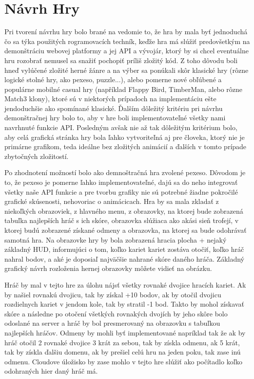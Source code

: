 \section{Návrh Hry}
Pri tvorení návrhu hry bolo brané na vedomie to, že hra by mala byť jednoduchá čo sa týka použitých rogramovacích techník, keďže hra má slúžiť predovšetkým na demonštráciu webovej platformy a jej API a vývojár, ktorý by si chcel eventuálne hru rozobrať nemusel sa snažiť pochopiť príliš zložitý kód. Z toho dôvodu boli hneď vylúčené zložité herné žánre a na výber sa ponúkali skôr klasické hry (rôzne logické stolné hry, ako pexeso, puzzle...), alebo pomerne nové obľúbené a populárne mobilné casual hry (například Flappy Bird, TimberMan, alebo rôzne Match3 klony), ktoré sú v niektorých prípadoch na implementáciu ešte jendoduchšie ako spomínané klasické. Ďalším dôležitý kritériu pri návrhu demonštračnej hry bolo to, aby v hre boli implementovateľné všetky nami navrhnuté funkcie API. Posledným avšak nie až tak dôležitým kritérium bolo, aby celá grafická stránka hry bola ľahko vytvoriteľná aj pre človeka, ktorý nie je primárne grafikom, teda ideálne bez zložitých animácií a ďalších v tomto prípade zbytočných zložitostí. 

Po zhodnotení možností bolo ako demnoštračná hra zvolené pexeso. Dôvodom je to, že pexeso je pomerne ľahko implementovateľné, dajú sa do neho integrovať všetky naše API funkcie a pre tvorbu grafiky nie sú potrebné žiadne pokročilé grafické skúsenosti, nehovoriac o animácicach. Hra by sa mala zkladať z niekoľkých obrazoviek, z hlavného menu, z obrazovky, na ktorej bude zobrazená tabuľka najlepších hráč s ich skóre, obrazovka slúžiaca ako akási sieň trofejí, v ktorej budú zobrazené získané odmeny a obrazovka, na ktorej sa bude odohrávať samotná hra. Na obrazovke hry by bola zobrazená hracia plocha + nejaký základný HUD, informujúci o tom, koľko kariet kariet zostáva otočiť, koľko hráč nahral bodov, a aké je doposiaľ najväčšie nahrané skóre daného hráča. Základný grafický návrh rozloženia hernej obrazovky môžete vidieť na obrázku. 

Hráč by mal v tejto hre za úlohu nájsť všetky rovnaké dvojice hracích kariet. Ak by našiel rovnakú dvojicu, tak by získal +10 bodov, ak by otočil dvojicu rozdielnych kariet v jendom kole, tak by stratil -1 bod. Takto by mohol získavať skóre a následne po otočení všetkých rovnakých dvojích by jeho skôre bolo odoslané na server a hráč by bol presmerovaný na obrazovku s tabuľkou najlepších hráčov. Odmeny by mohli byť implementované napríklad tak že ak by hráč otočil 2 rovnaké dvojice 3 krát za sebou, tak by získla odmenu, ak 5 krát, tak by získla ďalšiu domenu, ak by prešiel celú hru na jeden poku, tak zase inú odmenu. Cloudove úložisko by zase mohlo v tejto hre slúžiť ako počítadlo koľko odohraných hier daný hráč má. 

